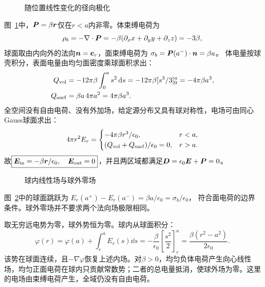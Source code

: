 \begin{figure}[H]\centering
{}
\caption{随位置线性变化的径向极化}\label{fig:es4-h1-q}
\end{figure}
\begin{solution}
图~\ref{fig:es4-h1-q}中，$\bm{P}=\beta\bm{r}$仅在$r<a$内非零。体束缚电荷为
\[
 \rho_b=-\nabla\cdot\bm{P}
 =-\beta(\partial_x x+\partial_y y+\partial_z z)=-3\beta,
\]
球面取由内向外的法向$\bm{n}=\bm{e}_r$，面束缚电荷为
$\sigma_b=\bm{P}(a^-)\cdot\bm{n}=\beta a$。
体电量按球壳积分，表面电量由均匀面密度乘球面积求出：
\[
 \begin{aligned}
 Q_{\rm vol}&=-12\pi\beta\int_0^as^2\mathop{}\!\mathrm d s
 =-12\pi\beta[s^3/3]_0^a=-4\pi\beta a^3,\\
 Q_{\rm surf}&=\beta a\,4\pi a^2=4\pi\beta a^3.
 \end{aligned}
\]
全空间没有自由电荷、没有外加场，给定源分布又具有球对称性，电场可由同心Gauss球面求出：
\[
 4\pi r^2E_r=
 \begin{cases}
 -4\pi\beta r^3/\epsilon_0,&r<a,\\
 (Q_{\rm vol}+Q_{\rm surf})/\epsilon_0=0,&r>a.
 \end{cases}
\]
故$\boxed{\bm{E}_{\rm in}=-\beta\bm{r}/\epsilon_0,\quad
 \bm{E}_{\rm out}=0}$，并且两区域都满足$\bm{D}=\epsilon_0\bm{E}+\bm{P}=0$。
\begin{figure}[H]\centering
{}
\caption{球内线性场与球外零场}\label{fig:es4-h1-s}
\end{figure}
图~\ref{fig:es4-h1-s}中的球面跳跃为
$E_r(a^+)-E_r(a^-)=\beta a/\epsilon_0=\sigma_b/\epsilon_0$，
符合面电荷的边界条件。球外零场并不要求两个法向场极限相同。

取无穷远电势为零，球外势恒为零。球内从球面积分：
\[
 \varphi(r)=\varphi(a)+\int_r^a E_r(s)\dd s
 =-\frac{\beta}{\epsilon_0}\left[\frac{s^2}{2}\right]_r^a
 =\boxed{\frac{\beta(r^2-a^2)}{2\epsilon_0}}.
\]
该势在球面连续，且$-\nabla\varphi$恢复上述内场。对$\beta>0$，均匀负体电荷产生向心线性场，均匀正面电荷在球内只贡献常数势；二者的总电量抵消，使球外场为零。这里的电场由束缚电荷产生，全域仍没有自由电荷。
\end{solution}

